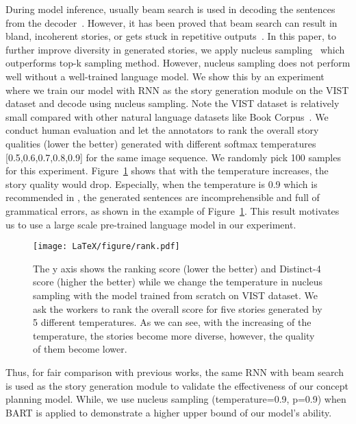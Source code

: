 During model inference, usually beam search is used in decoding the sentences from the decoder~\cite{wang2018no, jung2020hide, yu2017beam}. However, it has been proved that beam search can result in bland, incoherent stories, or gets stuck in repetitive outputs~\cite{holtzman2019curious}. In this paper, to further improve diversity in generated stories, we apply nucleus sampling~\cite{holtzman2019curious} which outperforms top-k sampling method. However, nucleus sampling does not perform well without a well-trained language model. We show this by an experiment where we train our model with RNN as the story generation module on the VIST dataset and decode using nucleus sampling. Note the VIST dataset is relatively small compared with other natural language datasets like Book Corpus~\cite{Zhu_2015_ICCV}. We conduct human evaluation and let the annotators to rank the overall story qualities (lower the better) generated with different softmax temperatures [0.5,0.6,0.7,0.8,0.9] for the same image sequence. We randomly pick 100 samples for this experiment. Figure~\ref{fig:rank} shows that with the temperature increases, the story quality would drop.
Especially, when the temperature is 0.9 which is recommended in \citet{holtzman2019curious}, the generated sentences are incomprehensible and full of grammatical errors, as shown in the example of Figure~\ref{fig:rank}. This result motivates us to use a large scale pre-trained language model in our experiment.
\begin{figure}[t]
\centering
\texttt{[image: LaTeX/figure/rank.pdf]}
\caption{The y axis shows the ranking score (lower the better) and Distinct-4 score (higher the better) while we change the temperature in nucleus sampling with the model trained from scratch on VIST dataset. 
We ask the workers to rank the overall score for five stories generated by 5 different temperatures.
As we can see, with the increasing of the temperature, the stories become more diverse, however, the quality of them become lower.}
\label{fig:rank}
\end{figure}

Thus, for fair comparison with previous works, the same RNN with beam search is used as the story generation module to validate the effectiveness of our concept planning model.
While, we use nucleus sampling (temperature=0.9, p=0.9) when BART \cite{lewis2019bart} is applied to demonstrate a higher upper bound of our model's ability.




